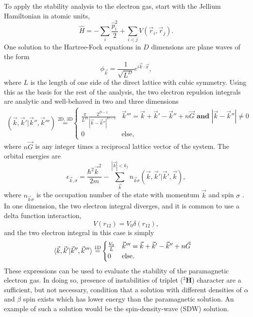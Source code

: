 \documentclass[preprint, journal=prl]{revtex4-1}
\begin{document}
  To apply the stability analysis to the electron gas, start with the Jellium Hamiltonian in atomic units, 
  \begin{equation}\label{hamiltonian}
   	\hat{H} = - \sum_i \frac{\hat{p}_i^2}{2}  + \sum_{i < j} V(\vec{r}_i, \vec{r}_j)  .
  \end{equation}
  One solution to the Hartree-Fock equations in $D$ dimensions are plane waves of the form	
  \begin{equation}\label{planewave}
   	\phi_{\vec{k}} =
    \frac{1} { \sqrt{L ^ D} } e ^ {i \vec{k} \cdot \vec{x}},
  \end{equation}
  where $L$ is the length of one side of the direct lattice with cubic symmetry. Using this as the basis for the rest of the analysis, the two electron repulsion integrals are analytic and  well-behaved in two and three dimensions\cite{Delyon2008, Guiliani2005}
  \begin{align}
    \left( \vec{k}, \vec{k}' | \vec{k}'', \vec{k}''' \right) 
    \stackrel{ \text{2D, 3D} }{=}&
    \begin{cases} 
      \frac{\pi} {L ^ D} \frac{ 2^{D-1} } { | \vec{k} - \vec{k}'' | ^ {D-1} } 
      & \vec{k}''' = \vec{k} + \vec{k}' - \vec{k}'' + n\vec{G} \textbf{ and } | \vec{k} - 
      \vec{k}''| \neq 0 \\
      0 
      & \text{else},
    \end{cases}
  \end{align}
  where $n\vec{G}$ is any integer times a reciprocal lattice vector of the system. The orbital energies are
  \begin{equation}\label{eq:hf_orb_energy}
    \epsilon_{\vec{k},\sigma}=
    \frac{\hbar^2\vec{k}^2}{2m} - \sum\limits_{\vec{k}}^{|\vec{k}|< 
    k_f}n_{\vec{k}\sigma} \left( \vec{k}, \vec{k}' |\vec{k}', \vec{k} \right),
  \end{equation}
  where $n_{\vec{k}\sigma}$ is the occupation number of the state with momentum $\vec{k}$ and spin $\sigma$ \cite{Guiliani2005}. In one dimension, the two electron integral diverges, and it is common to use a delta function interaction, 
  \begin{equation}
    V(r_{12}) = V_0\delta(r_{12}),
  \end{equation}
  and the two electron integral in this case is simply
  \begin{align}\label{eq:ERI_1d}
    \braket{\vec{k}, \vec{k}' | \vec{k}'', \vec{k}'''} 
    \stackrel{ \text{1D} }{=}&
    \begin{cases} 
      \frac{V_0}{L} 
      & \vec{k}''' = \vec{k} + \vec{k}' - \vec{k}'' + n\vec{G}\\
      0 
      & \text{else}.
    \end{cases}
  \end{align}  
  These expressions can be used to evaluate the stability of the paramagnetic electron gas. In doing so, presence of instabilities of triplet (${}^3\mathbf{H}$) character are a sufficient, but not necessary, condition that a solution with different densities of $\alpha$ and $\beta$ spin exists which has lower energy than the paramagnetic solution. An example of such a solution would be the spin-density-wave (SDW) solution. 
   
\end{document}
